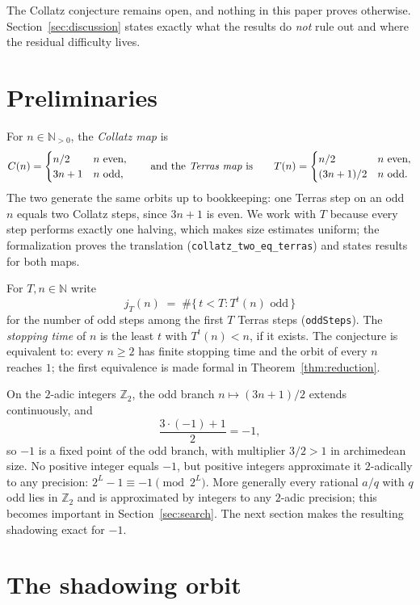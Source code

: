 \documentclass[11pt]{article}
\newcommand{\N}{\mathbb{N}}
\newcommand{\Z}{\mathbb{Z}}
\newcommand{\Ztwo}{\Z_2}
\newcommand{\code}[1]{\texttt{#1}}
\newcommand{\jodd}[2]{j_{#1}(#2)}
\begin{document}
The Collatz conjecture remains open, and nothing in this paper proves
otherwise. Section~\ref{sec:discussion} states exactly what the
results do \emph{not} rule out and where the residual difficulty
lives.

\section{Preliminaries}

For $n \in \N_{>0}$, the \emph{Collatz map} is
\[
C(n) = \begin{cases} n/2 & n \text{ even},\\ 3n+1 & n \text{ odd},\end{cases}
\qquad\text{and the \emph{Terras map} is}\qquad
T(n) = \begin{cases} n/2 & n \text{ even},\\ (3n+1)/2 & n \text{ odd}.\end{cases}
\]
The two generate the same orbits up to bookkeeping: one Terras step on
an odd $n$ equals two Collatz steps, since $3n+1$ is even. We work with
$T$ because every step performs exactly one halving, which makes size
estimates uniform; the formalization proves the translation
(\code{collatz\_two\_eq\_terras}) and states results for both maps.

For $T, n \in \N$ write
\[
\jodd{T}{n} \;=\; \#\bigl\{\, t < T : T^t(n) \text{ odd} \,\bigr\}
\]
for the number of odd steps among the first $T$ Terras steps
(\code{oddSteps}). The \emph{stopping time} of $n$ is the least $t$
with $T^t(n) < n$, if it exists. The conjecture is equivalent to:
every $n \ge 2$ has finite stopping time and the orbit of every $n$
reaches $1$; the first equivalence is made formal in
Theorem~\ref{thm:reduction}.

On the $2$-adic integers $\Ztwo$, the odd branch $n \mapsto (3n+1)/2$
extends continuously, and
\[
\frac{3 \cdot (-1) + 1}{2} = -1,
\]
so $-1$ is a fixed point of the odd branch, with multiplier $3/2 > 1$ in
archimedean size. No positive integer equals $-1$, but positive integers
approximate it $2$-adically to any precision: $2^L - 1 \equiv -1
\pmod{2^L}$. More generally every rational $a/q$ with $q$ odd lies in
$\Ztwo$ and is approximated by integers to any $2$-adic precision; this
becomes important in Section~\ref{sec:search}. The next section makes
the resulting shadowing exact for $-1$.

\section{The shadowing orbit}\label{sec:shadow}
\end{document}
